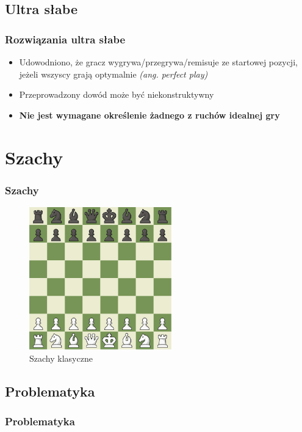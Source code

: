 \documentclass[polish,envcountsect,10pt]{beamer}
\begin{document}
        \subsection{Ultra słabe}
            \begin{frame}
                \frametitle{Rozwiązania ultra słabe}
                \begin{itemize}
                    \item<1-> Udowodniono, że gracz wygrywa/przegrywa/remisuje ze startowej pozycji, jeżeli wszyscy grają optymalnie \textit{(ang. perfect play)}
                    \item<2-> Przeprowadzony dowód może być niekonstruktywny
                    \item<3-> \textbf{Nie jest wymagane określenie żadnego z ruchów idealnej gry}
                \end{itemize}
            \end{frame}
            
    \section{Szachy}
        \begin{frame}
            \frametitle{Szachy}
            \begin{figure}[]
                \centering
                \includegraphics[width=0.55\textwidth]{images/chess.png}
                \caption{Szachy klasyczne}
            \end{figure}
        \end{frame}
        \subsection{Problematyka}
            \begin{frame}
               \frametitle{Problematyka} 
            \end{frame}
\end{document}
